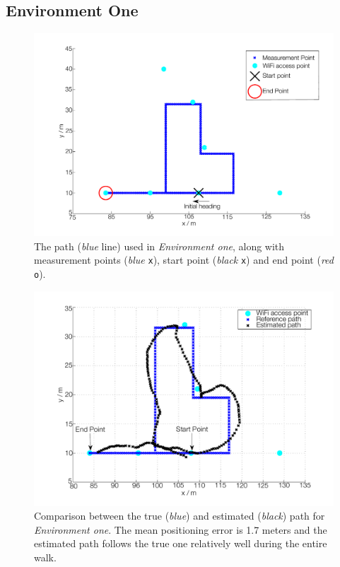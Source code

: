 \documentclass{LTHthesis}
\begin{document}
\subsection{Environment One} 
%

%
\begin{figure}[!hbt]

\includegraphics[width=1\textwidth ]{images/pure_rssi/env_one}
\caption{The path (\emph{blue} line) used in \emph{Environment one}, along with measurement points (\emph{blue} \texttt{x}), start point (\emph{black} \texttt{x}) and end point (\emph{red} \texttt{o}).}\label{env_one}
\end{figure}
%
\begin{figure}[!hbt]

\includegraphics[width=1\textwidth ]{images/pure_rssi/true_vs_est_env_1_05}
\caption{Comparison between the true (\emph{blue}) and estimated (\emph{black}) path for \emph{Environment one}. The mean positioning error is 1.7 meters and the estimated path follows the true one relatively well during the entire walk.}\label{true_vs_est_env_1_05}
\end{figure}
\end{document}
